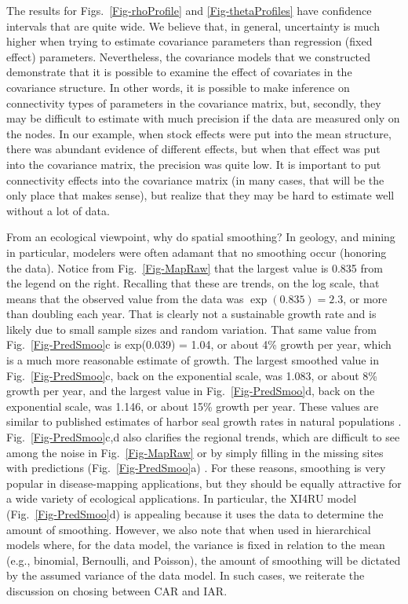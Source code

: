 \documentclass[11pt, titlepage]{article}\usepackage[]{graphicx}\usepackage[]{color}
\begin{document}
The results for Figs.~\ref{Fig-rhoProfile} and \ref{Fig-thetaProfiles} have confidence intervals that are quite wide.  We believe that, in general, uncertainty is much higher when trying to estimate covariance parameters than regression (fixed effect) parameters. Nevertheless, the covariance models that we constructed demonstrate that it is possible to examine the effect of covariates in the covariance structure.  In other words, it is possible to make inference on connectivity types of parameters in the covariance matrix, but, secondly, they may be difficult to estimate with much precision if the data are measured only on the nodes.  In our example, when stock effects were put into the mean structure, there was abundant evidence of different effects, but when that effect was put into the covariance matrix, the precision was quite low.  It is important to put connectivity effects into the covariance matrix (in many cases, that will be the only place that makes sense), but realize that they may be hard to estimate well without a lot of data.

From an ecological viewpoint, why do spatial smoothing?  In geology, and mining in particular, modelers were often adamant that no smoothing occur (honoring the data).  Notice from Fig.~\ref{Fig-MapRaw} that the largest value is 0.835 from the legend on the right.  Recalling that these are trends, on the log scale, that means that the observed value from the data was $\exp(0.835)=2.3$, or more than doubling each year.  That is clearly not a sustainable growth rate and is likely due to small sample sizes and random variation.  That same value from Fig.~\ref{Fig-PredSmoo}c is exp(0.039) = 1.04, or about 4\% growth per year, which is a much more reasonable estimate of growth.  The largest smoothed value in Fig.~\ref{Fig-PredSmoo}c, back on the exponential scale, was 1.083, or about 8\% growth per year, and the largest value in Fig.~\ref{Fig-PredSmoo}d, back on the exponential scale, was 1.146, or about 15\% growth per year. These values are similar to published estimates of harbor seal growth rates in natural populations \citep[e.g.,][]{Hast:Smal:Pend:sex:2012}.  Fig.~\ref{Fig-PredSmoo}c,d also clarifies the regional trends, which are difficult to see among the noise in Fig.~\ref{Fig-MapRaw} or by simply filling in the missing sites with predictions (Fig.~\ref{Fig-PredSmoo}a) .  For these reasons, smoothing is very popular in disease-mapping applications, but they should be equally attractive for a wide variety of ecological applications. In particular, the XI4RU model (Fig.~\ref{Fig-PredSmoo}d) is appealing because it uses the data to determine the amount of smoothing.  However, we also note that when used in hierarchical models where, for the data model, the variance is fixed in relation to the mean (e.g., binomial, Bernoulli, and Poisson), the amount of smoothing will be dictated by the assumed variance of the data model.  In such cases, we reiterate the discussion on chosing between CAR and IAR.
\end{document}
